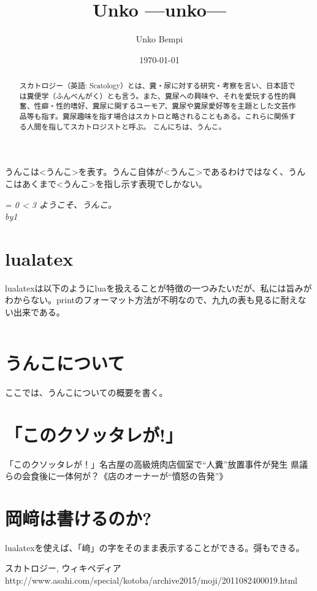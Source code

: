 \documentclass{ltjsarticle}
\author{Unko Bempi}
\date{\和暦\today}
\title{Unko ---unko---}
\def\myfor#1{
    \it = 0 \loop\ifnum\it < #1
    ようこそ、うんこ。\\
    \advance\it by1\repeat
}
\begin{document}
\maketitle
\tableofcontents
%
\begin{abstract}
    スカトロジー（英語: Scatology）とは、糞・尿に対する研究・考察を言い、日本語では糞便学（ふんべんがく）とも言う。また、糞尿への興味や、それを愛玩する性的興奮、性癖・性的嗜好、糞尿に関するユーモア、糞尿や糞尿愛好等を主題とした文芸作品等も指す。糞尿趣味を指す場合はスカトロと略されることもある。これらに関係する人間を指してスカトロジストと呼ぶ\cite{wiki}。
    こんにちは、うんこ。
\end{abstract}
%
うんこは<うんこ>を表す。うんこ自体が<うんこ>であるわけではなく、うんこはあくまで<うんこ>を指し示す表現でしかない。
    \myfor{3}
%
\section{lualatex}
\newcommand{\texcmd}{some txtxtxtxtxtxt}
%
lualatexは以下のようにluaを扱えることが特徴の一つみたいだが、私には旨みがわからない。printのフォーマット方法が不明なので、九九の表も見るに耐えない出来である。
%
\begin{center}
    $ $
\end{center}
\section{うんこについて}
ここでは、うんこについての概要を書く。

\section{「このクソッタレが!」}
「このクソッタレが！」名古屋の高級焼肉店個室で“人糞”放置事件が発生 県議らの会食後に一体何が？《店のオーナーが“憤怒の告発”》


\section{岡﨑は書けるのか?}
lualatexを使えば、「﨑」の字をそのまま表示することができる。彁\cite{yurei}もできる。






\begin{thebibliography}{99}
     スカトロジー, ウィキペディア
     http://www.asahi.com/special/kotoba/archive2015/moji/2011082400019.html
\end{thebibliography}
\end{document}
